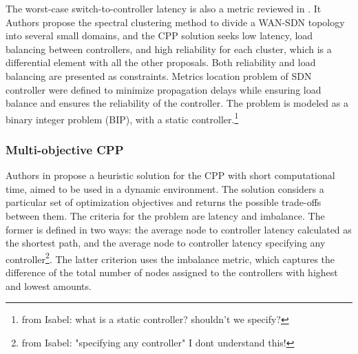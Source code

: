 \documentclass{IEEEtran}
\newcommand\fia[1]{{\color{red}\footnote{\color{red}from Isabel: #1}}} %
\newcommand\mia[1]{{\color{red}#1}}%
\newcommand\delia[1]{{\tiny{\color{red}#1}}} %
\begin{document}
The worst-case \mia{switch-to-controller} latency is \mia{also} \delia{a metric} reviewed in \cite{XiQu14}. \delia{It} \mia{Authors} propose the spectral clustering method to divide a WAN-SDN topology into several small domains, and the CPP solution seeks low latency, load balancing between controllers, and high reliability for each cluster, which is a differential element with all the other proposals. Both reliability and load balancing are presented as constraints. \delia{Metrics location problem of SDN controller were defined to minimize propagation delays while ensuring load balance and ensures the reliability of the controller.} The problem is modeled as a binary integer problem (BIP), with a static controller.\fia{what is a static controller? shouldn't we specify?} %


\subsubsection{Multi-objective CPP}




Authors in \cite{LaGeb15} propose a heuristic solution for the CPP with short computational time, aimed to be used in a dynamic environment. The solution considers a particular set of optimization objectives and returns the possible trade-offs between them. The criteria for the problem are latency and imbalance. The former is defined in two ways: the average node to controller latency calculated as the shortest path, and the average node to controller latency specifying any controller\fia{"specifying any controller" I dont understand this!}. The latter criterion uses the imbalance metric, which captures the difference of the total number of nodes assigned to the controllers with highest and lowest amounts.
\end{document}
